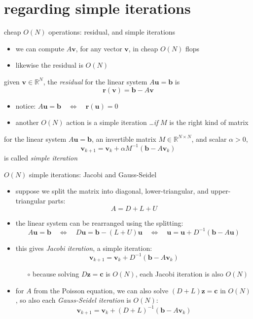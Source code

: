 \documentclass[10pt,
               svgnames,
               hyperref={colorlinks,citecolor=DeepPink4,linkcolor=FireBrick,urlcolor=Maroon},
               usepdftitle=false]{beamer}
\newcommand{\bb}{\mathbf{b}}
\newcommand{\bc}{\mathbf{c}}
\newcommand{\br}{\mathbf{r}}
\newcommand{\bu}{\mathbf{u}}
\newcommand{\bv}{\mathbf{v}}
\newcommand{\bz}{\mathbf{z}}
\newcommand{\RR}{\mathbb{R}}
\begin{document}
\section{regarding simple iterations}

\begin{frame}{cheap $O(N)$ operations: residual, and simple iterations}
\begin{itemize}
\item we can compute $A\bv$, for any vector $\bv$, in cheap $O(N)$ flops
\item likewise the residual is $O(N)$
\end{itemize}

\begin{definition} given $\bv \in\RR^N$, the \emph{residual} for the linear system $A\bu=\bb$ is
	$$\br(\bv) = \bb - A\bv$$
\end{definition}

\begin{itemize}
\item notice: \qquad $A\bu = \bb \quad \iff \quad \br(\bu) = 0$
\item another $O(N)$ action is a simple iteration \dots \emph{if} $M$ is the right kind of matrix
\end{itemize}

\begin{definition} for the linear system $A\bu=\bb$, an invertible matrix $M\in \RR^{N\times N}$, and scalar $\alpha>0$,
    $$\bv_{k+1} = \bv_k + \alpha M^{-1} \left(\bb - A \bv_k\right)$$
is called \emph{simple iteration}
\end{definition}
\end{frame}


\begin{frame}{$O(N)$ simple iterations: Jacobi and Gauss-Seidel}
\begin{itemize}
\item suppose we split the matrix into diagonal, lower-triangular, and upper-triangular parts:
	$$A=D + L + U$$
\item the linear system can be rearranged using the splitting:
	$$A\bu=\bb \quad \iff \quad D \bu = \bb - (L+U) \bu \quad \iff \quad \bu = \bu + D^{-1} (\bb - A \bu)$$
\item this gives \emph{Jacobi iteration}, a simple iteration:
	$$\bv_{k+1} = \bv_k + D^{-1} (\bb - A \bv_k)$$

	\begin{itemize}
	\item[$\circ$] because solving $D\bz = \bc$ is $O(N)$, each Jacobi iteration is also $O(N)$
	\end{itemize}
\item for $A$ from the Poisson equation, we can also solve $(D+L)\bz=\bc$ in $O(N)$, so also each \emph{Gauss-Seidel iteration} is $O(N)$:
	$$\bv_{k+1} = \bv_k + (D+L)^{-1} (\bb - A \bv_k)$$
\end{itemize}
\end{frame}
\end{document}
